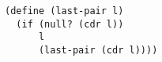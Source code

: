 \documentclass[a4paper,12pt]{article}
\begin{document}
\begin{lstlisting}
(define (last-pair l)
  (if (null? (cdr l))
      l
      (last-pair (cdr l))))
\end{lstlisting}
\end{document}
